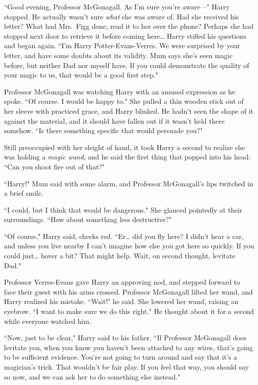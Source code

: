 ``Good evening, Professor McGonagall. As I'm sure you're aware---" Harry stopped. He actually wasn't sure \emph{what} she was aware of. Had she received his letter? What had Mrs.~Figg done, read it to her over the phone? Perhaps she had stopped next door to retrieve it before coming here{\ldots} Harry stifled his questions and began again. ``I'm Harry Potter-Evans-Verres. We were surprised by your letter, and have some doubts about its validity. Mum says she's seen magic before, but neither Dad nor myself have. If you could demonstrate the quality of your magic to us, that would be a good first step."

Professor McGonagall was watching Harry with an amused expression as he spoke. ``Of course. I would be happy to." She pulled a thin wooden stick out of her sleeve with practiced grace, and Harry blinked. He hadn't seen the shape of it against the material, and it should have fallen out if it wasn't held there somehow. ``Is there something specific that would persuade you?"

Still preoccupied with her sleight of hand, it took Harry a second to realize she was holding a \emph{magic wand}, and he said the first thing that popped into his head: ``Can you shoot fire out of that?"

``Harry!" Mum said with some alarm, and Professor McGonagall's lips twitched in a brief smile.

``I could, but I think that would be dangerous." She glanced pointedly at their surroundings. ``How about something less destructive?"

``Of course," Harry said, cheeks red. ``Er{\ldots} did you fly here? I didn't hear a car, and unless you live nearby I can't imagine how else you got here so quickly. If you could just{\ldots} hover a bit? That might help. Wait, on second thought, levitate Dad."

Professor Verres-Evans gave Harry an approving nod, and stepped forward to face their guest with his arms crossed. Professor McGonagall lifted her wand, and Harry realized his mistake. ``Wait!" he said. She lowered her wand, raising an eyebrow. ``I want to make sure we do this right." He thought about it for a second while everyone watched him.

``Now, just to be clear," Harry said to his father. ``If Professor McGonagall does levitate you, when you know you haven't been attached to any wires, that's going to be sufficient evidence. You're not going to turn around and say that it's a magician's trick. That wouldn't be fair play. If you feel that way, you should say so now, and we can ask her to do something else instead."

